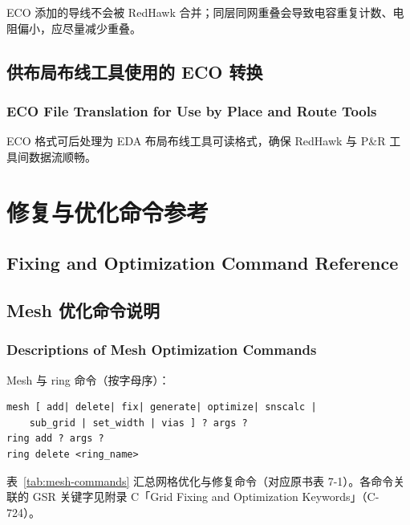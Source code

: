 \begin{noteBox}
ECO 添加的导线不会被 RedHawk 合并；同层同网重叠会导致电容重复计数、电阻偏小，应尽量减少重叠。
\end{noteBox}

\subsection{供布局布线工具使用的 ECO 转换}
\subsubsection*{ECO File Translation for Use by Place and Route Tools}

ECO 格式可后处理为 EDA 布局布线工具可读格式，确保 RedHawk 与 P\&R 工具间数据流顺畅。

\section{修复与优化命令参考}
\subsection*{Fixing and Optimization Command Reference}

\subsection{Mesh 优化命令说明}
\subsubsection*{Descriptions of Mesh Optimization Commands}

Mesh 与 ring 命令（按字母序）：
\begin{lstlisting}
mesh [ add| delete| fix| generate| optimize| snscalc |
    sub_grid | set_width | vias ] ? args ?
ring add ? args ?
ring delete <ring_name>
\end{lstlisting}

表~\ref{tab:mesh-commands} 汇总网格优化与修复命令（对应原书表 7-1）。各命令关联的 GSR 关键字见附录 C「Grid Fixing and Optimization Keywords」（C-724）。

